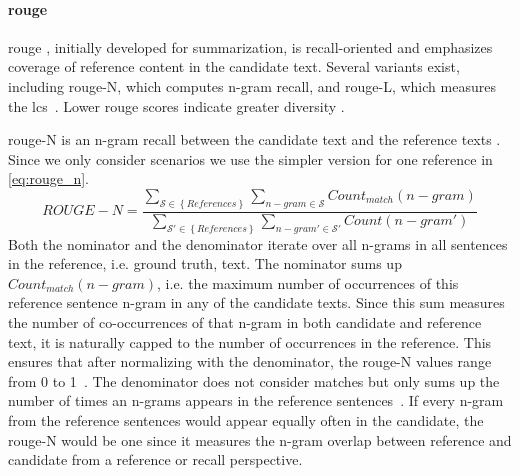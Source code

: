 
\paragraph{\ac{rouge}}
\ac{rouge} \citep{lin_rouge_2004}, initially developed for summarization, is recall-oriented and emphasizes coverage of reference content in the candidate text. 
Several variants exist, including \ac{rouge}-N, which computes n-gram recall, and \ac{rouge}-L, which measures the \ac{lcs}~\citep{zhou_paraphrase_2021,palivela_optimization_2021,kurt_pehlivanoglu_comparative_2024}. 
Lower \ac{rouge} scores indicate greater diversity \citep{kurt_pehlivanoglu_comparative_2024}.

\ac{rouge}-N is an n-gram recall between the candidate text and the reference texts \citep{lin_rouge_2004}.
Since we only consider scenarios we use the simpler version for one reference in \autoref{eq:rouge_n}.
\begin{equation}
    ROUGE-N = \frac{\sum_{\mathcal{S} \in \left\{ References \right\}}\sum_{n-gram \in\mathcal{S}}Count_{match}(n-gram)}{\sum_{\mathcal{S'} \in \left\{ References \right\}}\sum_{n-gram' \in\mathcal{S'}}Count(n-gram')}
\label{eq:rouge_n}
\end{equation}
Both the nominator and the denominator iterate over all n-grams in all sentences in the reference, i.e. ground truth, text.
The nominator sums up $Count_{match}(n-gram)$, i.e. the maximum number of occurrences of this reference sentence n-gram in any of the candidate texts.
Since this sum measures the number of co-occurrences of that n-gram in both candidate and reference text, it is naturally capped to the number of occurrences in the reference.
This ensures that after normalizing with the denominator, the \ac{rouge}-N values range from 0 to 1~\citep{kurt_pehlivanoglu_comparative_2024}.
The denominator does not consider matches but only sums up the number of times an n-grams appears in the reference sentences~\citep{lin_rouge_2004}.
If every n-gram from the reference sentences would appear equally often in the candidate, the \ac{rouge}-N would be one since it measures the n-gram overlap between reference and candidate from a reference or recall perspective.

